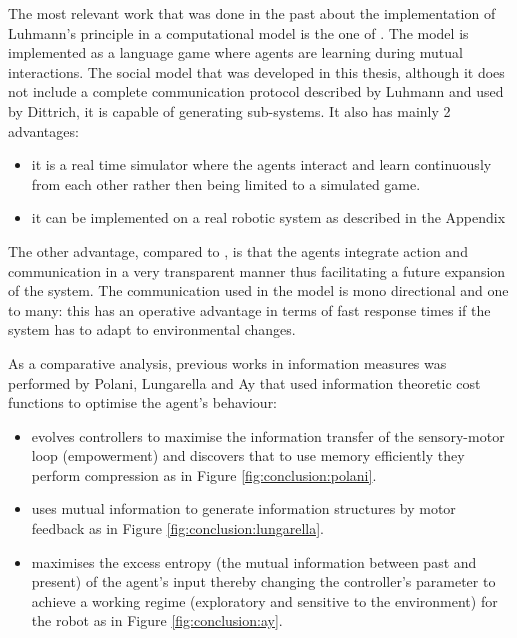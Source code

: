 The most relevant work that was done in the past about the implementation
of Luhmann's principle in a computational model is the one of \citet{SocialOrderScalability}.
The model is implemented as a language game where agents are learning
during mutual interactions.
The social model that was developed in this thesis, although it does not include
 a complete communication protocol described by Luhmann and used by Dittrich,
it is capable of generating sub-systems.
It also has mainly 2 advantages:
\begin{itemize}
 \item it is a real time simulator where the agents interact and learn continuously
 from each other rather then being limited to a simulated game.
 \item it can be implemented on a real robotic system as described in the Appendix 
\end{itemize}

The other advantage, compared to \citet{SocialOrderScalability}, is that
the agents integrate action and communication in a very transparent manner
thus facilitating a future expansion of the system.
The communication used in the model is mono directional and one to many:
this has an operative advantage in terms of fast response times if the
system has to adapt to environmental changes.

As a comparative analysis, previous works in information measures was performed by Polani,
 Lungarella and Ay that used information theoretic cost functions to optimise the agent's behaviour:
\begin{itemize}
\item \citet{organizationInfo} evolves controllers to maximise the information transfer
of the sensory-motor loop (empowerment) and discovers that to use memory efficiently they perform 
compression as in Figure \ref{fig:conclusion:polani}.
\item \citet{LungarellaInformation} uses mutual information to generate information structures by motor feedback as in Figure \ref{fig:conclusion:lungarella}.
\item \citet{AyClosedLoop} maximises the excess entropy (the mutual information between past and present) 
 of the agent's input thereby changing the controller's parameter to achieve a 
 working regime (exploratory and sensitive to the environment) for the robot as in Figure \ref{fig:conclusion:ay}.
\end{itemize}


